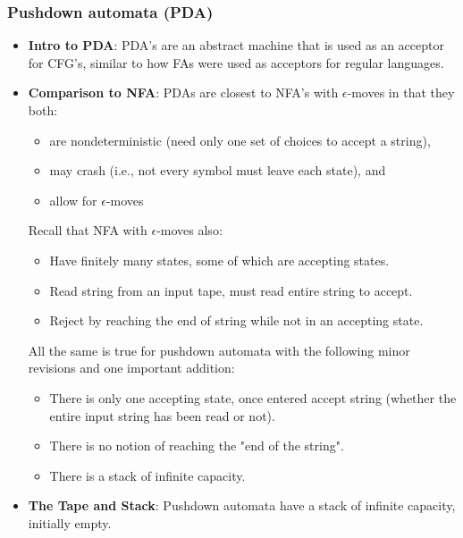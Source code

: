 \documentclass{report}
\begin{document}
    \pagebreak 
    \subsubsection{Pushdown automata (PDA)}
    \begin{itemize}
        \item \textbf{Intro to PDA}: PDA's are an abstract machine that is used as an acceptor for CFG's, similar to how FAs were used as acceptors for regular languages.
        \item \textbf{Comparison to NFA}: PDAs are closest to NFA's with $\epsilon$-moves in that they both:
            \begin{itemize}
                \item are nondeterministic (need only one set of choices to accept a string),
                \item may crash (i.e., not every symbol must leave each state), and
                \item allow for $\epsilon$-moves
            \end{itemize}
            Recall that NFA with $\epsilon$-moves also:
            \begin{itemize}
                \item                 Have finitely many states, some of which are accepting states.
                \item                 Read string from an input tape, must read entire string to accept.
                \item                 Reject by reaching the end of string while not in an accepting state.
            \end{itemize}
            All the same is true for pushdown automata with the following minor revisions and one important addition:
            \begin{itemize}
                \item \relax [revision] There is only one accepting state, once entered accept string (whether the entire input string has been read or not).
                \item \relax [revision] There is no notion of reaching the "end of the string".
                \item \relax [addition] There is a stack of infinite capacity.
            \end{itemize}
        \item \textbf{The Tape and Stack}: Pushdown automata have a stack of infinite capacity, initially empty.

\end{itemize}
\end{document}
